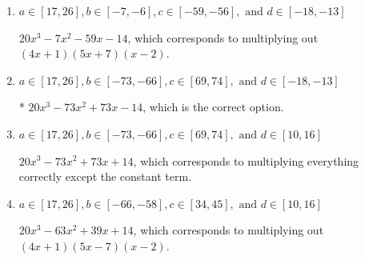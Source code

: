 \documentclass{extbook}[14pt]
\begin{document}
\begin{enumerate}
{\begin{enumerate}[label=\Alph*.]
$20x^{3} +73 x^{2} +73 x + 14$, which corresponds to multiplying out $(4x + 1)(5x + 7)(x + 2)$.
\item \( a \in [17, 26], b \in [-7, -6], c \in [-59, -56], \text{ and } d \in [-18, -13] \)

$20x^{3} -7 x^{2} -59 x -14$, which corresponds to multiplying out $(4x + 1)(5x + 7)(x -2)$.
\item \( a \in [17, 26], b \in [-73, -66], c \in [69, 74], \text{ and } d \in [-18, -13] \)

* $20x^{3} -73 x^{2} +73 x -14$, which is the correct option.
\item \( a \in [17, 26], b \in [-73, -66], c \in [69, 74], \text{ and } d \in [10, 16] \)

$20x^{3} -73 x^{2} +73 x + 14$, which corresponds to multiplying everything correctly except the constant term.
\item \( a \in [17, 26], b \in [-66, -58], c \in [34, 45], \text{ and } d \in [10, 16] \)

$20x^{3} -63 x^{2} +39 x + 14$, which corresponds to multiplying out $(4x + 1)(5x -7)(x -2)$.
\end{enumerate}

}
\end{enumerate}
\end{document}
